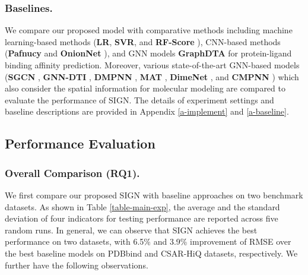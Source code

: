 \documentclass[sigconf]{acmart}
\newcommand{\zhoucom}[1]{{\color{red}(zhoucom:#1)}} \newcommand{\li}[1]{{\color{green} \sout{#1}}} \newcommand{\old}[1]{{\color{black}#1}} \newcommand{\licom}[1]{{\color{black}#1}} \newcommand{\hide}[1]{}
\newcommand{\B}[1]{{\bfseries #1}}
\newcommand{\model}{\textsf{SIGN}\xspace}
\begin{document}
\subsubsection{Baselines.}
We compare our proposed model with comparative methods including machine learning-based methods (\B{LR}, \B{SVR}, and \B{RF-Score} \cite{ballester2010machine}), CNN-based methods (\B{Pafnucy} \cite{stepniewska2018development} and \B{OnionNet} \cite{zheng2019onionnet}), and GNN models \B{GraphDTA} \cite{10.1093/bioinformatics/btaa921} for protein-ligand binding affinity prediction. Moreover, various state-of-the-art GNN-based models (\B{SGCN} \cite{danel2020spatial}, \B{GNN-DTI} \cite{lim2019predicting}, \B{DMPNN} \cite{yang2019analyzing}, \B{MAT} \cite{maziarka2020molecule}, \B{DimeNet} \cite{klicpera_dimenet_2020}, and \B{CMPNN} \cite{song2020communicative}) which also consider the spatial information for molecular modeling are compared to \hide{demonstrate the effectiveness}evaluate the performance of \model. The details of \hide{implementation, }experiment settings and baseline descriptions are provided \hide{below} in Appendix \ref{a-implement} and \ref{a-baseline}.

\hide{
\subsubsection{Implementation Details.}
We implement our experiments based on Pytorch, except for Pafnucy \cite{stepniewska2018development} where we use the authors’ Tensorflow implementation. We train all models on 24 Intel CPUs and a Tesla K80 GPU with 12 GB memory. Note that DimeNet \cite{klicpera_dimenet_2020} is not compared in our experiment. \zhoucom{change lager} \li{ because it can not model the larger molecules and will raise the out-of-memory error when training protein-ligand complexes.} 
The model input and parameter settings for baselines and our method are introduced in Appendix \ref{a-implement}.
}
\vspace{-1mm}

\subsection{Performance Evaluation}
\subsubsection{Overall Comparison (RQ1).}
We first compare our proposed \model with baseline approaches on two benchmark datasets. As shown in Table \ref{table-main-exp}, the average and the standard deviation of four indicators for testing performance are reported across five random runs. In general, we can observe that \model achieves the best performance on two datasets, with 6.5\% and 3.9\% improvement of RMSE over the best baseline models on PDBbind and CSAR-HiQ datasets, respectively. We further have the following observations.
\end{document}
